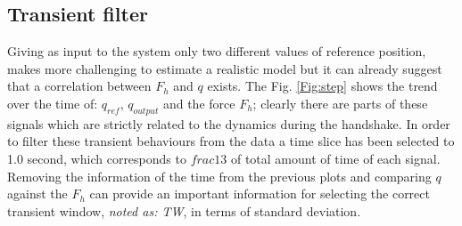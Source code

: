 \subsection{Transient filter}\label{sec:transientStep}
Giving as input to the system only two different values of reference position, makes more challenging to estimate a realistic model but it can already suggest that a correlation between $F_{h}$ and $q$ exists.
The Fig. \ref{Fig:step} shows the trend over the time of: $q_{ref}$, $q_{output}$ and the force $F_{h}$; clearly there are parts of these signals which are strictly related to the dynamics during the handshake. 
In order to filter these transient behaviours from the data a time slice has been selected to 1.0 second, which corresponds to $frac{1}{3}$ of total amount of time of each signal.
Removing the information of the time from the previous plots and comparing $q$ against the $F_{h}$ can provide an important information for selecting the correct transient window, \textit{noted as: TW}, in terms of standard deviation. \\


